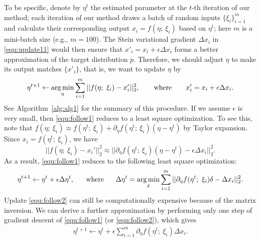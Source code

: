 \documentclass{article} %
\begin{document}
To be specific, denote by $\eta^t$ the estimated parameter at the $t$-th iteration of our method; 
each iteration of our method 
draws a batch of random inputs $\{\xi_i\}_{i=1}^m$ 
and calculate their corresponding output $x_i = f(\eta;~\xi_i)$ based on $\eta^t$; here $m$ is a mini-batch size (e.g., $m=100$). 
The Stein variational gradient $\Delta x_i$ in 
\eqref{equ:update11} would then ensure that $x'_i = x_i + \epsilon \Delta x_i$ forms a better approximation of the target distribution $p$. 
Therefore, we should adjust $\eta$ to make its output matches $\{x'_i\}$, 
that is, we want to update $\eta$ by
\begin{align}\label{equ:follow1}
\eta^{t+1} \gets  \operatorname*{arg\,min}_\eta  \sum_{i=1}^m ||  f(\eta;~\xi_i)  - x_i' ||_2^2,  ~~~~~~ \text{where} ~~~~~~  x_i'  = x_i  + \epsilon \Delta x_i. 
\end{align}
See Algorithm~\ref{alg:alg1} for the summary of this procedure. If we assume $\epsilon$ is very small, then 
\eqref{equ:follow1} reduces to a least square optimization. To see this, note that 
$f(\eta;~\xi_i) \approx f(\eta^t;~\xi_i) + \partial_\eta f(\eta^t;~\xi_i) (\eta - \eta^t)$ by Taylor expansion. 
Since $x_i = f(\eta^t;~\xi_i)$, we have
$$
 ||  f(\eta;~\xi_i)  - x_i' ||_2^2 \approx || \partial_\eta f(\eta^t;~\xi_i) (\eta  - \eta^t)  - \epsilon \Delta x_i  ||_2^2. 
$$
As a result, \eqref{equ:follow1} reduces to the following least square optimization: 
\begin{align}\label{equ:follow2}
\eta^{t+1} \gets \eta^t + \epsilon \Delta \eta^t, 
\text{~~~~~where~~~~~}
\Delta \eta^t = \operatorname*{arg\,min}_{\delta}  \sum_{i=1}^m   || \partial_\eta f(\eta^t;~\xi_i)  \delta   -  \Delta x_i  ||_2^2. 
\end{align}
Update \eqref{equ:follow2} can still be computationally expensive because of the matrix inversion. 
We can derive a further approximation by performing only one step of gradient descent of \eqref{equ:follow1} (or \eqref{equ:follow2}), which gives 
\begin{align}\label{equ:follow3}
\eta^{t+1} \gets \eta^t + \epsilon  \sum_{i=1}^m   \partial_\eta f(\eta^t;~\xi_i) \Delta x_i. 
\end{align}
\end{document}
